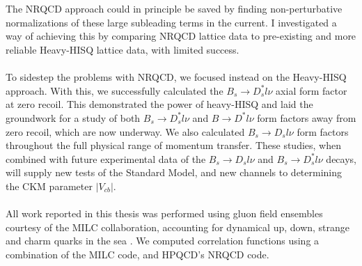 \\ \\
The NRQCD approach could in principle be saved by finding non-perturbative normalizations of these large subleading terms in the current. I investigated a way of achieving this by comparing NRQCD lattice data to pre-existing and more reliable Heavy-HISQ lattice data, with limited success.
\\ \\
To sidestep the problems with NRQCD, we focused instead on the Heavy-HISQ approach. With this, we successfully calculated the $B_s\to D_s^*l\nu$ axial form factor at zero recoil. This demonstrated the power of heavy-HISQ and laid the groundwork for a study of both $B_s\to D_s^*l\nu$ and $B\to D^*l\nu$ form factors away from zero recoil, which are now underway. We also calculated $B_s\to D_sl\nu$ form factors throughout the full physical range of momentum transfer. These studies, when combined with future experimental data of the $B_s\to D_sl\nu$ and $B_s\to D_s^*l\nu$ decays, will supply new tests of the Standard Model, and new channels to determining the CKM parameter $|V_{cb}|$.
\\ \\
All work reported in this thesis was performed using gluon field ensembles courtesy of the MILC collaboration, accounting for dynamical up, down, strange and charm quarks in the sea \cite{Bazavov:2012xda,Bazavov:2010ru}. We computed correlation functions using a combination of the MILC code, and HPQCD's NRQCD code.

